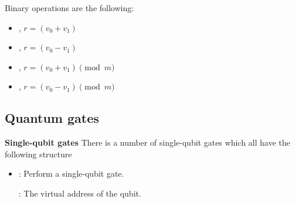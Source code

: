 Binary operations are the following:
\begin{itemize}
  \item {}, $r = (v_0 + v_1)$
  \item {}, $r = (v_0 - v_1)$
  \item {}, $r = (v_0 + v_1) \pmod{m} $
  \item {}, $r = (v_0 - v_1) \pmod{m} $
\end{itemize}

\subsection{Quantum gates}
\textbf{Single-qubit gates}
There is a number of single-qubit gates which all have the following structure
\begin{itemize}
  \item {}: Perform a single-qubit gate.

        : The virtual address of the qubit.
\end{itemize}

